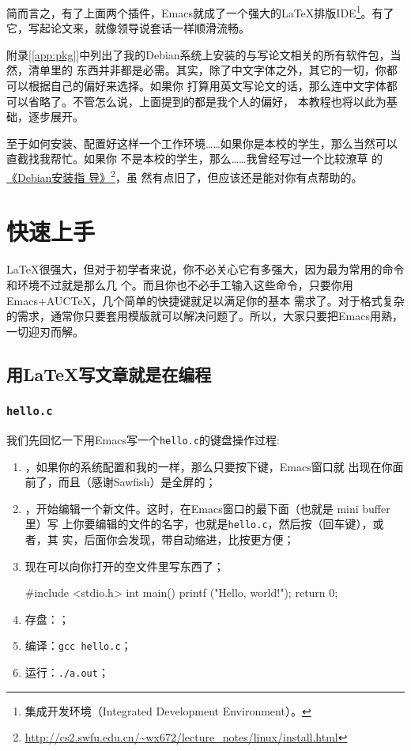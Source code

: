 \documentclass{swfcthesis}
\begin{document}
\begin{description}
  简而言之，有了上面两个插件，Emacs就成了一个强大的\LaTeX{}排版IDE\footnote{集成开发环境（Integrated
    Development Environment）。}。有了它，写起论文来，就像领导说套话一样顺滑流畅。
\end{description}

附录[\ref{app:pkg}]中列出了我的Debian系统上安装的与写论文相关的所有软件包，当然，清单里的
东西并非都是必需。其实，除了中文字体之外，其它的一切，你都可以根据自己的偏好来选择。如果你
打算用英文写论文的话，那么连中文字体都可以省略了。不管怎么说，上面提到的都是我个人的偏好，
本教程也将以此为基础，逐步展开。

至于如何安装、配置好这样一个工作环境……如果你是本校的学生，那么当然可以直截找我帮忙。如果你
不是本校的学生，那么……我曾经写过一个比较潦草
的\href{http://cs2.swfu.edu.cn/~wx672/lecture_notes/linux/install.html}{《Debian安装指
  导》}\footnote{\url{http://cs2.swfu.edu.cn/~wx672/lecture_notes/linux/install.html}}，虽
然有点旧了，但应该还是能对你有点帮助的。


\chapter{快速上手}

\LaTeX{}很强大，但对于初学者来说，你不必关心它有多强大，因为最为常用的命令和环境不过就是那么几
个。而且你也不必手工输入这些命令，只要你用Emacs+AUC\TeX{}，几个简单的快捷键就足以满足你的基本
需求了。对于格式复杂的需求，通常你只要套用模版就可以解决问题了。所以，大家只要把Emacs用熟，
一切迎刃而解。

\section{用LaTeX写文章就是在编程}
\label{sec:hello}

\subsection{\texttt{hello.c}}
\label{sec:hello.c}

我们先回忆一下用Emacs写一个\texttt{hello.c}的键盘操作过程:

\begin{enumerate}
\item \Se{}，如果你的系统配置和我的一样，那么只要按下\Se{}键，Emacs窗口就
  出现在你面前了，而且（感谢Sawfish）是全屏的；
\item \Cx \Cf{}，开始编辑一个新文件。这时，在Emacs窗口的最下面（也就是 mini buffer 里）写
  上你要编辑的文件的名字，也就是\texttt{hello.c}，然后按\Enter{}（回车键），或者\Cj{}，其
  实，后面你会发现，\Cj{}带自动缩进，比按\Enter{}更方便；
\item 现在可以向你打开的空文件里写东西了；

  \begin{ccode}
    #include <stdio.h>
    int main()
    {
      printf ("Hello, world!\n");
      return 0;
    }
  \end{ccode}

\item 存盘：\Cx \Cs{}；
\item 编译：\texttt{gcc hello.c}；
\item 运行：\texttt{./a.out}；
\end{enumerate}
\end{document}
